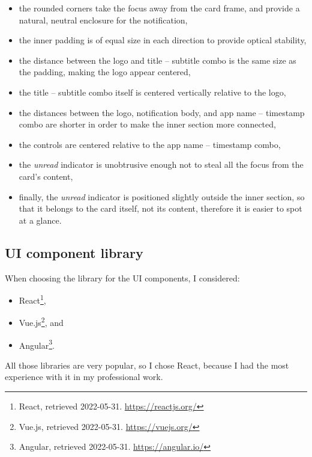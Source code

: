 \begin{itemize}
	\tightlist
	\item
	      the rounded corners take the focus away from the card frame, and
	      provide a natural, neutral enclosure for the notification,
	\item
	      the inner padding is of equal size in each direction to provide
	      optical stability,
	\item
	      the distance between the logo and title -- subtitle combo is the same
	      size as the padding, making the logo appear centered,
	\item
	      the title -- subtitle combo itself is centered vertically relative to
	      the logo,
	\item
	      the distances between the logo, notification body, and app name --
	      timestamp combo are shorter in order to make the inner section more
	      connected,
	\item
	      the controls are centered relative to the app name -- timestamp combo,
	\item
	      the \emph{unread} indicator is unobtrusive enough not to steal all the
	      focus from the card's content,
	\item
	      finally, the \emph{unread} indicator is positioned slightly outside
	      the inner section, so that it belongs to the card itself, not its
	      content, therefore it is easier to spot at a glance.
\end{itemize}

\hypertarget{ui-component-library}{%
	\subsection{UI component library}\label{ui-component-library}}

When choosing the library for the UI components, I considered:

\begin{itemize}
	\tightlist
	\item
	      React\footnote{React, retrieved 2022-05-31. \url{https://reactjs.org/}},
	\item
	      Vue.js\footnote{Vue.js, retrieved 2022-05-31. \url{https://vuejs.org/}},
	      and
	\item
	      Angular\footnote{Angular, retrieved 2022-05-31.
	      	\url{https://angular.io/}}.
\end{itemize}

All those libraries are very popular, so I chose React, because I had
the most experience with it in my professional work.

